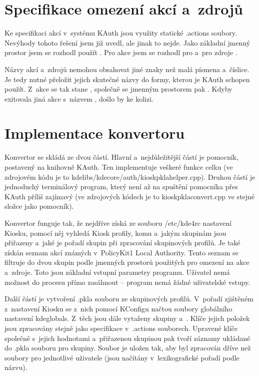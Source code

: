 \section{Specifikace omezení akcí a~zdrojů}
Ke specifikaci akcí v~systému KAuth jsou využity statické .actions soubory. Nevýhody tohoto řešení jsem již uvedl, ale jinak to nejde. Jako základní jmenný prostor jsem se rozhodl použít . Pro akce jsem se rozhodl pro  a~pro zdroje .

Názvy akcí a~zdrojů nemohou obsahovat jiné znaky než malá písmena a~číslice. Je tedy nutné přeložit jejich skutečné názvy do formy, kterou je KAuth schopen použít. Z~akce  se tak stane , společně se jmenným prostorem pak \linebreak{}. Kdyby exitovala jiná akce s~názvem  , došlo by ke kolizi.

\section{Implementace konvertoru}
Konvertor se skládá ze dvou částí. Hlavní a~nejdůležitější částí je pomocník, postavený na knihovně KAuth. Ten implementuje veškeré funkce celku (ve zdrojovém kódu je to kdelibs/kdecore/auth/kioskpklahelper.cpp). Druhou částí je jednoduchý terminálový program, který není až na spuštění pomocníka přes KAuth příliš zajímavý (ve zdrojových kódech je to kioskpklaconvert.cpp ve stejné složce jako pomocník).

Konvertor funguje tak, že nejdříve získá ze souboru /etc/kde4rc nastavení Kiosku, pomocí něj vyhledá Kiosk profily, komu a~jakým skupinám jsou přiřazeny a~jaké je pořadí skupin při zpracování skupinových profilů. Je také získán seznam akcí známých v~PolicyKit1 Local Authority. Tento seznam se filtruje do dvou skupin podle jmenných prostorů použitých pro omezení na akce a~zdroje. Toto jsou základní vstupní parametry programu. Uživatel nemá možnost do procesu přímo zasáhnout -- program nemá žádné uživatelské vstupy.

Další částí je vytvoření .pkla souboru ze skupinových profilů. V~pořadí zjištěném z~nastavení Kiosku se z~nich pomocí KConfigu načtou soubory globálního nastavení kdeglobals. Z~těch jsou dále vytaženy skupiny  a~. Klíče jejich položek jsou zpracovány stejně jako specifikace v~.actions souborech. Upravené klíče společně s~jejich hodnotami a~přiřazenou skupinou pak tvoří záznamy ukládané do .pkla souboru pro skupiny. Soubor je uložen tak, aby byl zpracován dříve než soubory pro jednotlivé uživatele (jsou načítány v~lexikografické pořadí podle názvu).

